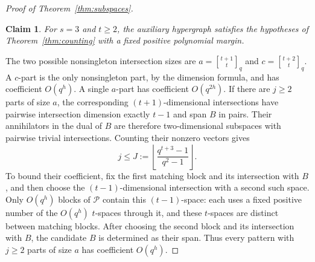 \documentclass[11pt,reqno]{amsart}
\makeatletter
\numberwithin{equation}{section}
\theoremstyle{plain}
\newtheorem{claim}{Claim}[section]
\newenvironment{claimproof}[1][Proof]{\par
    \pushQED{\qed}%
    \renewcommand{\qedsymbol}{$\blacksquare$}
    \normalfont \topsep6\p@\@plus6\p@\relax
    \trivlist
    \item[\hskip\labelsep
    \textit{#1}\@addpunct{.}~]\ignorespaces
}{%
    \popQED\endtrivlist\@endpefalse
}
\theoremstyle{definition}
\newcommand{\calP}{\mathcal{P}}
\newcommand{\qbinom}[2]{\genfrac{[}{]}{0pt}{}{#1}{#2}_q}
\makeatother
\begin{document}
\begin{proof}[Proof of Theorem~\ref{thm:subspaces}]
    \begin{claim}\label{clm:subspace-three}
        For $s=3$ and $t\ge2$, the auxiliary hypergraph satisfies the hypotheses of Theorem~\ref{thm:counting} with a fixed positive polynomial margin.
    \end{claim}
    \begin{claimproof}[Proof of Claim~\ref{clm:subspace-three}]
    The two possible nonsingleton intersection sizes are $a=\qbinom{t+1}t$ and $c=\qbinom{t+2}t$.
    A $c$-part is the only nonsingleton part, by the dimension formula, and has coefficient $O(q^h)$.
    A single $a$-part has coefficient $O(q^{2h})$.
    If there are $j\ge2$ parts of size $a$, the corresponding $(t+1)$-dimensional intersections have pairwise intersection dimension exactly $t-1$ and span $B$ in pairs.
    Their annihilators in the dual of $B$ are therefore two-dimensional subspaces with pairwise trivial intersections.
    Counting their nonzero vectors gives
    \[
        j\le J:=\left\lfloor\frac{q^{t+3}-1}{q^2-1}\right\rfloor.
    \]
    To bound their coefficient, fix the first matching block and its intersection with $B$, and then choose the $(t-1)$-dimensional intersection with a second such space.
    Only $O(q^h)$ blocks of $\calP$ contain this $(t-1)$-space: each uses a fixed positive number of the $O(q^h)$ $t$-spaces through it, and these $t$-spaces are distinct between matching blocks.
    After choosing the second block and its intersection with $B$, the candidate $B$ is determined as their span.
    Thus every pattern with $j\ge2$ parts of size $a$ has coefficient $O(q^h)$.


\end{claimproof}
\end{proof}
\end{document}
